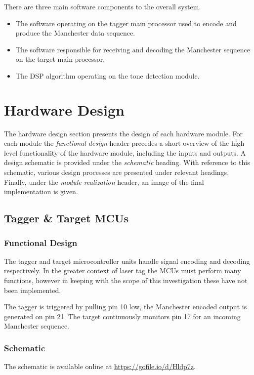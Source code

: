 There are three main software components to the overall system.
\begin{itemize}
	\item The software operating on the tagger main processor used to encode and produce the Manchester data sequence.
	\item The software responsible for receiving and decoding the Manchester sequence on the target main processor.
	\item  The DSP algorithm operating on the tone detection module.
\end{itemize}






\section{Hardware Design}
The hardware design section presents the design of each hardware module. For each module the \textit{functional design} header precedes a short overview of the high level functionality of the hardware module, including the inputs and outputs. A design schematic is provided under the \textit{schematic} heading. With reference to this schematic, various design processes are presented under relevant headings. Finally, under the \textit{module realization} header, an image of the final implementation is given.


\subsection{Tagger \& Target MCUs}

\subsubsection{Functional Design}
The tagger and target microcontroller units handle signal encoding and decoding respectively. In the greater context of laser tag the MCUs must perform many functions, however in keeping with the scope of this investigation these have not been implemented.

The tagger is triggered by pulling pin 10 low, the Manchester encoded output is generated on pin 21. The target continuously monitors pin 17 for an incoming Manchester sequence.

\subsubsection{Schematic}
The schematic is available online at \href{https://gofile.io/d/Hldp7z}{https://gofile.io/d/Hldp7z}.


